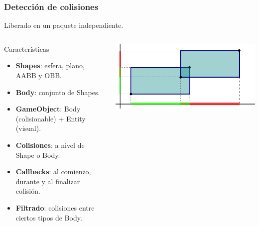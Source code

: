 \documentclass[green]{beamer}
\begin{document}
\begin{frame}
\transdissolve
    \frametitle{Detección de colisiones}
    
    \tiny{
    \begin{center}
	Liberado en un paquete independiente.
    \end{center}
    }
    
    
    \begin{columns}[t]
    \column{150pt}
        
	\tiny{
	\begin{block}{Características}
            \begin{itemize}
                \item \textbf{Shapes}: esfera, plano, AABB y OBB.
		\item \textbf{Body}: conjunto de Shapes.
		\item \textbf{GameObject}: Body (colisionable) + Entity (visual).
		\item \textbf{Colisiones}: a nivel de Shape o Body.
		\item \textbf{Callbacks}: al comienzo, durante y al finalizar colisión.
		\item \textbf{Filtrado}: colisiones entre ciertos tipos de Body.
            \end{itemize}            
        \end{block}
	}
	
	\begin{center}
	    \includegraphics[scale=0.3]{img/test-aabb-aabb.png}
	\end{center}

    \column{150pt}
	

\end{columns}
\end{frame}
\end{document}
